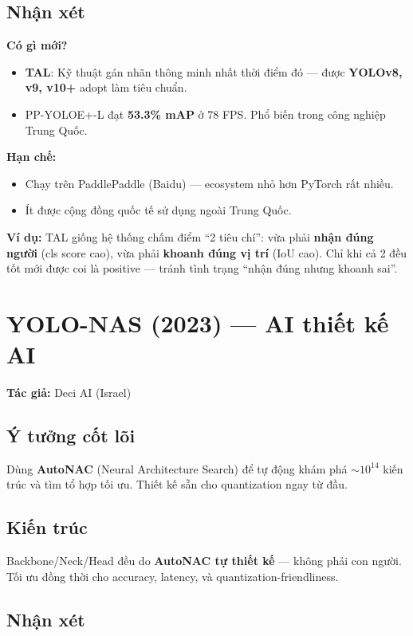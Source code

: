 \documentclass[12pt,a4paper]{report}
\begin{document}
\subsection{Nhận xét}

\textbf{Có gì mới?}
\begin{itemize}
    \item \textbf{TAL}: Kỹ thuật gán nhãn thông minh nhất thời điểm đó --- được \textbf{YOLOv8, v9, v10+} adopt làm tiêu chuẩn.
    \item PP-YOLOE+-L đạt \textbf{53.3\% mAP} ở 78 FPS. Phổ biến trong công nghiệp Trung Quốc.
\end{itemize}

\textbf{Hạn chế:}
\begin{itemize}
    \item Chạy trên PaddlePaddle (Baidu) --- ecosystem nhỏ hơn PyTorch rất nhiều.
    \item Ít được cộng đồng quốc tế sử dụng ngoài Trung Quốc.
\end{itemize}

\textbf{Ví dụ:} TAL giống hệ thống chấm điểm ``2 tiêu chí'': vừa phải \textbf{nhận đúng người} (cls score cao), vừa phải \textbf{khoanh đúng vị trí} (IoU cao). Chỉ khi cả 2 đều tốt mới được coi là positive --- tránh tình trạng ``nhận đúng nhưng khoanh sai''.

\section{YOLO-NAS (2023) --- AI thiết kế AI}
\textbf{Tác giả:} Deci AI (Israel)

\subsection{Ý tưởng cốt lõi}
Dùng \textbf{AutoNAC} (Neural Architecture Search) để tự động khám phá $\sim 10^{14}$ kiến trúc và tìm tổ hợp tối ưu. Thiết kế sẵn cho quantization ngay từ đầu.

\subsection{Kiến trúc}
Backbone/Neck/Head đều do \textbf{AutoNAC tự thiết kế} --- không phải con người. Tối ưu đồng thời cho accuracy, latency, và quantization-friendliness.

\subsection{Nhận xét}
\end{document}
